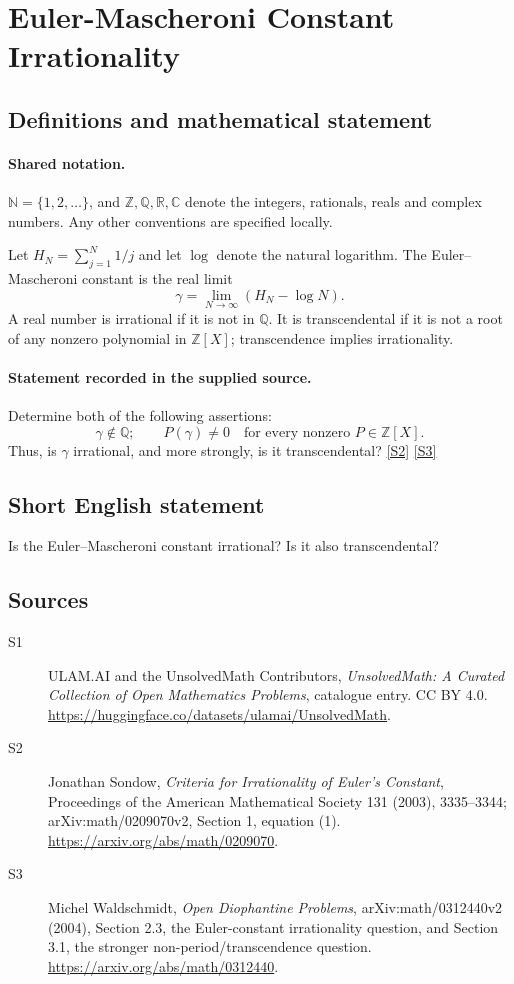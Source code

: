 \documentclass[11pt]{article}
\newcommand{\sref}[2]{\hyperlink{source:#1:#2}{[S#2]}}
\begin{document}
\section{Euler-Mascheroni Constant Irrationality}\label{statement}

\subsection{Definitions and mathematical statement}

\paragraph{Shared notation.}$\mathbb N=\{1,2,\ldots\}$, and $\mathbb Z,\mathbb Q,\mathbb R,\mathbb C$ denote the integers, rationals, reals and complex numbers. Any other conventions are specified locally.


Let \(H_N=\sum_{j=1}^N1/j\) and let \(\log\) denote
the natural logarithm. The Euler--Mascheroni constant is the real limit
\[
                \gamma=\lim_{N\to\infty}(H_N-\log N).
\]
A real number is irrational if it is not in \(\mathbb Q\).
It is transcendental if it is not a root of any nonzero polynomial
in \(\mathbb Z[X]\); transcendence implies irrationality.
\paragraph{Statement recorded in the supplied source.}
Determine both of the following assertions:
\[
 \gamma\notin\mathbb Q;
 \qquad P(\gamma)\ne0\quad\text{for every nonzero }P\in\mathbb Z[X].
\]
Thus, is \(\gamma\) irrational, and more strongly, is it transcendental? \sref{statement}{2} \sref{statement}{3}
\subsection{Short English statement}
Is the Euler--Mascheroni constant irrational? Is it also transcendental?
\subsection{Sources}
\begin{description}
\item[\hypertarget{source:statement:1}{S1}] ULAM.AI and the UnsolvedMath Contributors, \emph{UnsolvedMath: A Curated Collection of Open Mathematics Problems}, catalogue entry. CC BY 4.0. \url{https://huggingface.co/datasets/ulamai/UnsolvedMath}.
\item[\hypertarget{source:statement:2}{S2}] Jonathan Sondow, \emph{Criteria for Irrationality of Euler's Constant}, Proceedings of the American Mathematical Society 131 (2003), 3335--3344; arXiv:math/0209070v2, Section 1, equation (1). \url{https://arxiv.org/abs/math/0209070}.
\item[\hypertarget{source:statement:3}{S3}] Michel Waldschmidt, \emph{Open Diophantine Problems}, arXiv:math/0312440v2 (2004), Section 2.3, the Euler-constant irrationality question, and Section 3.1, the stronger non-period/transcendence question. \url{https://arxiv.org/abs/math/0312440}.
\end{description}
\label{end:statement}
\end{document}
